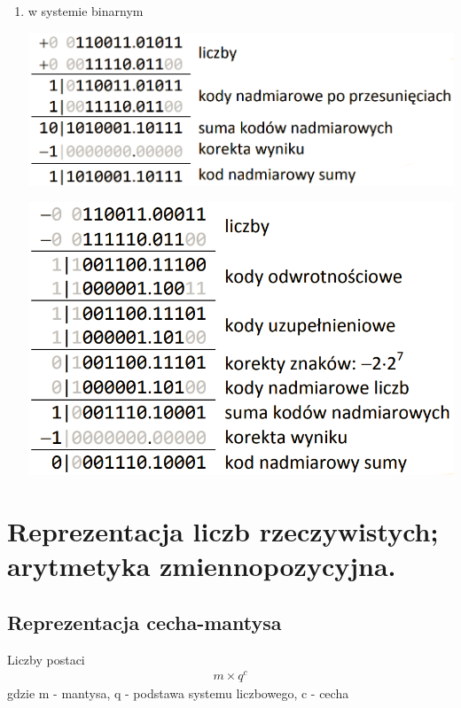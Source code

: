 \documentclass[12pt]{article}
\begin{document}
\begin{enumerate}
        \item w systemie binarnym
            \begin{center}
                \includegraphics[scale=0.4]{graphics/number-repr/nad-add-bin.png}
            \end{center}
            \begin{center}    
                \includegraphics[scale=0.4]{graphics/number-repr/nad-add-bin-2.png}
            \end{center}
    \end{enumerate}
    
    
    
    
    
    
    \newpage
    
    \section{Reprezentacja liczb rzeczywistych; arytmetyka zmiennopozycyjna.}
    
    \subsection{Reprezentacja cecha-mantysa}
    Liczby postaci
    \begin{align*}
        m \times q^c
    \end{align*}
    gdzie m - mantysa, q - podstawa systemu liczbowego, c - cecha
    
\end{document}
